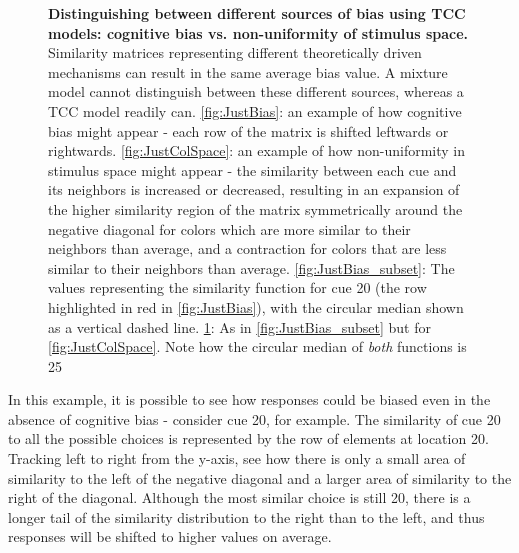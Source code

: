 \begin{figure}
\begin{subfigure}[b]{0.49\textwidth}
         \label{fig:JustColSpace_subset}
    \end{subfigure}
        \caption{\textbf{Distinguishing between different sources of bias using TCC models: cognitive bias vs. non-uniformity of stimulus space.} Similarity matrices representing different theoretically driven mechanisms can result in the same average bias value. A mixture model cannot distinguish between these different sources, whereas a TCC model readily can. \ref{fig:JustBias}: an example of how cognitive bias might appear - each row of the matrix is shifted leftwards or rightwards. \ref{fig:JustColSpace}: an example of how non-uniformity in stimulus space might appear - the similarity between each cue and its neighbors is increased or decreased, resulting in an expansion of the higher similarity region of the matrix symmetrically around the negative diagonal for colors which are more similar to their neighbors than average, and a contraction for colors that are less similar to their neighbors than average. \ref{fig:JustBias_subset}: The values representing the similarity function for cue 20 (the row highlighted in red in \ref{fig:JustBias}), with the circular median shown as a vertical dashed line. \ref{fig:JustColSpace_subset}: As in \ref{fig:JustBias_subset} but for \ref{fig:JustColSpace}. Note how the circular median of \emph{both} functions is 25}
        \label{fig:distinguishing}
\end{figure}

In this example, it is possible to see how responses could be biased even in the absence of cognitive bias - consider cue 20, for example. 
The similarity of cue 20 to all the possible choices is represented by the row of elements at location 20. Tracking left to right from the y-axis, see how there is only a small area of similarity to the left of the negative diagonal and a larger area of similarity to the right of the diagonal. 
Although the most similar choice is still 20, there is a longer tail of the similarity distribution to the right than to the left, and thus responses will be shifted to higher values on average. %


